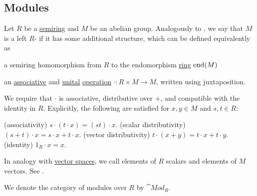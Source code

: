 \subsection{Modules}\label{subsec:modules}

\begin{definition}\label{def:left_module}
  Let \( R \) be a \hyperref[def:semiring/identity]{semiring} and \( M \) be an abelian group. Analogously to , we say that \( M \) is a left \( R \)- if it has some additional structure, which can be defined equivalently as
  \begin{thmenum}
     a semiring homomorphism from \( R \) to the endomorphism \hyperref[def:endomorphism_semiring]{ring} \( \operatorname{end}(M) \)

    \cite[374]{Knapp2016BasicAlgebra} an \hyperref[def:magma/associative]{associative} and \hyperref[def:monoid]{unital} \hyperref[def:monoid_action/family]{operation} \( \cdot: R \times M \to M \), written using juxtaposition.

    We require that \( \cdot \) is associative, distributive over \( + \), and compatible with the identity in \( R \). Explicitly, the following are satisfied for \( x, y \in M \) and \( s, t \in R \):
    \begin{thmenum}
      (associativity) \( s \cdot (t \cdot x) = (s t) \cdot x \).
      (scalar distributivity) \( (s + t) \cdot x = s \cdot x + t \cdot x \).
      (vector distributivity) \( t \cdot (x + y) = t \cdot x + t \cdot y \).
      (identity) \( 1_R \cdot x = x \).
    \end{thmenum}
  \end{thmenum}

  In analogy with \hyperref[def:vector_space]{vector spaces}, we call elements of \( R \) scalars and elements of \( M \) vectors. See .

  We denote the category of modules over \( R \) by \( \cat{Mod}_R \).
\end{definition}
